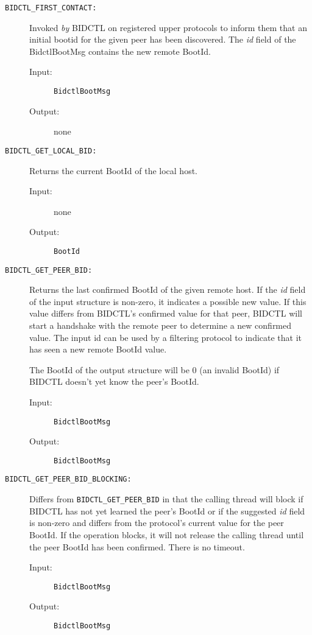 \begin{description}

\item[{\tt BIDCTL\_FIRST\_CONTACT:}]
Invoked {\em by} BIDCTL on registered upper protocols to inform them
that an initial bootid for the given peer has been discovered.  
The {\em id} field of the BidctlBootMsg
contains the new remote BootId. 
\begin{description}
\item[{\rm Input:}] { \tt BidctlBootMsg }
\item[{\rm Output:}] none
\end{description}

\item[{\tt BIDCTL\_GET\_LOCAL\_BID:}]
Returns the current BootId of the local host.  
\begin{description}
\item[{\rm Input:}] none
\item[{\rm Output:}] {\tt BootId }
\end{description}

\item[{\tt BIDCTL\_GET\_PEER\_BID:}]
Returns the last confirmed BootId of the given remote host.  
If the {\em
id} field of the input structure is non-zero, it indicates a possible
new value.  If this value differs from BIDCTL's confirmed value for
that peer,
BIDCTL will start a handshake with the remote peer to determine a new confirmed
value.  The input id can be used by a filtering protocol to indicate that it
has seen a new remote BootId value.

The BootId of the output structure will be 0
(an invalid BootId) if
BIDCTL doesn't yet know the peer's BootId.
\begin{description}
\item[{\rm Input:}] {\tt BidctlBootMsg }
\item[{\rm Output:}] {\tt BidctlBootMsg }
\end{description}

\item[{\tt BIDCTL\_GET\_PEER\_BID\_BLOCKING:}]
Differs from {\tt BIDCTL\_GET\_PEER\_BID} in that the calling thread
will block if BIDCTL has not yet learned the peer's BootId or if the
suggested {\em id} field is non-zero and differs from the protocol's
current value for the peer BootId.  If the operation blocks, it will
not release the calling thread until the peer BootId has been
confirmed.  There is no timeout.

\begin{description}
\item[{\rm Input:}] {\tt BidctlBootMsg }
\item[{\rm Output:}] {\tt BidctlBootMsg }
\end{description}



\end{description}

